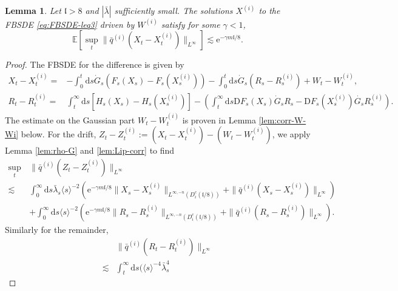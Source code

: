 \documentclass[11pt, a4paper]{scrartcl}
\numberwithin{equation}{section}
\theoremstyle{plain}
\newtheorem{lemma}[foo]{Lemma}
\theoremstyle{remark}
\newcommand{\assign}{:=}
\newcommand{\mathD}{\mathrm{D}}
\newcommand{\mathd}{\mathrm{d}}
\newcommand{\mathe}{\mathrm{e}}
\newcommand{\nosymbol}{}
\begin{document}
\begin{lemma}
  \label{lem:FBSDE-decay-est}Let $\mathfrak{l}> 8$ and $|\bar{\lambda}|$ sufficiently small.
  The solutions $X^{(i)}$ to
  the FBSDE \eqref{eq:FBSDE-leq3} driven by $W^{(i)}$ satisfy for some $\gamma
  < 1$,
  \[ \mathbb{E} \left[\sup_t \| \bar{q}^{(i)} (X_t - X_t^{(i)}) \|_{L^{\infty}}\right]
     \lesssim \mathe^{- \gamma m\mathfrak{l}/ 8} . \]
\end{lemma}

\begin{proof}
 The FBSDE for the difference is given by
  {\footnotesize\[  \begin{aligned}
       X_t - X_t^{(i)} =& -\int_{0^{\nosymbol}}^t \mathd s \dot{G}_s (F_s
       (X_s^{\nosymbol})-F_s (X_s^{(i)})) - \int_0^t \mathd s \dot{G}_s (R_s-R_s^{(i)}) + W_t - W_t^{(i)},\\
       R_t - R_t^{(i)} =& \int_t^{\infty} \mathd s [H_s (X_s) - H_s
       (X_s^{(i)})]- \left(\int_t^{\infty} \mathd s \mathD F_s (X^{\nosymbol}_s) 
       \dot{G}_s R_s - \mathD F_s (X_s^{(i)}) \dot{G_s} R_s^{(i)}\right) .
     \end{aligned}  \]}
  The estimate on the Gaussian part $W_t - W_t^{(i)}$ is proven in Lemma
  \ref{lem:corr-W-Wi} below. For the drift, $Z_t - Z_t^{(i)} \assign (X_t -
  X_t^{(i)}) - (W_t - W_t^{(i)})$, we apply Lemma \ref{lem:rho-G} and \ref{lem:Lip-corr} to find
  \begin{equation}
    \begin{aligned}
      \sup_t\, &\| \bar{q}^{(i)} (Z_t - Z_t^{(i)}) \|_{L^{\infty}} \\ 
      \lesssim& 
      \int_0^{\infty} \mathd s \bar{\lambda}_s \langle s \rangle^{- 2} (\mathe^{-
      \gamma m\mathfrak{l}/ 8} \| X_s - X_s^{(i)} \|_{L^{\infty, - n} (D_i^c
      (\mathfrak{l}/ 8))} + \| \bar{q}^{(i)} (X_s - X_s^{(i)})
      \|_{L^{\infty}})\\
       & + \int_0^{\infty} \mathd s \langle s \rangle^{- 2} (\mathe^{-
      \gamma m\mathfrak{l}/ 8} \| R_s - R_s^{(i)} \|_{L^{\infty, - n} (D_i^c
      (\mathfrak{l}/ 8))} + \| \bar{q}^{(i)} (R_s - R_s^{(i)})
      \|_{L^{\infty}}) .
    \end{aligned} \label{eq:Z-Zi}
  \end{equation}
  Similarly for the remainder,
  \begin{equation}
    \begin{aligned}
      & \| \bar{q}^{(i)} (R_t - R_t^{(i)}) \|_{L^{\infty}}\\
      \lesssim & \int_t^{\infty} \mathd s (\langle s \rangle^{- 4} \bar{\lambda}_s^4

\end{aligned}
\end{equation}
\end{proof}
\end{document}
